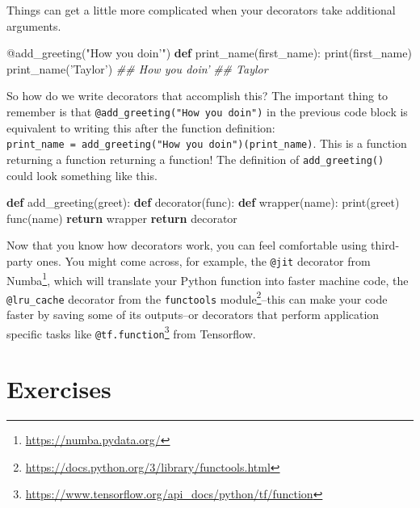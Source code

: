 \documentclass[12pt,krantz2]{krantz}
\makeatletter
\newenvironment{Shaded}{\begin{snugshade}}{\end{snugshade}}
\newcommand{\AttributeTok}[1]{\textcolor[rgb]{0.61,0.61,0.61}{#1}}
\newcommand{\BuiltInTok}[1]{#1}
\newcommand{\CommentTok}[1]{\textcolor[rgb]{0.37,0.37,0.37}{\textit{#1}}}
\newcommand{\ControlFlowTok}[1]{\textcolor[rgb]{0.27,0.27,0.27}{\textbf{#1}}}
\newcommand{\KeywordTok}[1]{\textcolor[rgb]{0.27,0.27,0.27}{\textbf{#1}}}
\newcommand{\NormalTok}[1]{#1}
\newcommand{\StringTok}[1]{\textcolor[rgb]{0.5,0.5,0.5}{#1}}
\renewcommand{\href}[2]{#2\footnote{\url{#1}}}
\newenvironment{kframe}{%
\medskip{}
\setlength{\fboxsep}{.8em}
 \def\at@end@of@kframe{}%
 \ifinner\ifhmode%
  \def\at@end@of@kframe{\end{minipage}}%
  \begin{minipage}{\columnwidth}%
 \fi\fi%
 \def\FrameCommand##1{\hskip\@totalleftmargin \hskip-\fboxsep
 \colorbox{shadecolor}{##1}\hskip-\fboxsep
     \hskip-\linewidth \hskip-\@totalleftmargin \hskip\columnwidth}%
 \MakeFramed {\advance\hsize-\width
   \@totalleftmargin\z@ \linewidth\hsize
   \@setminipage}}%
 {\par\unskip\endMakeFramed%
 \at@end@of@kframe}
\renewenvironment{Shaded}{\begin{kframe}}{\end{kframe}}
\makeatother
\begin{document}
Things can get a little more complicated when your decorators take additional arguments.

\begin{Shaded}
\begin{Highlighting}[]
\AttributeTok{@add_greeting}\NormalTok{(}\StringTok{"How you doin'"}\NormalTok{)}
\KeywordTok{def}\NormalTok{ print_name(first_name):}
    \BuiltInTok{print}\NormalTok{(first_name)}
\NormalTok{print_name(}\StringTok{'Taylor'}\NormalTok{)}
\CommentTok{## How you doin'}
\CommentTok{## Taylor}
\end{Highlighting}
\end{Shaded}

So how do we write decorators that accomplish this? The important thing to remember is that \texttt{@add\_greeting("How\ you\ doin\textquotesingle{}")} in the previous code block is equivalent to writing this after the function definition: \texttt{print\_name\ =\ add\_greeting("How\ you\ doin\textquotesingle{}")(print\_name)}. This is a function returning a function returning a function! The definition of \texttt{add\_greeting()} could look something like this.

\begin{Shaded}
\begin{Highlighting}[]
\KeywordTok{def}\NormalTok{ add_greeting(greet):}
    \KeywordTok{def}\NormalTok{ decorator(func):}
        \KeywordTok{def}\NormalTok{ wrapper(name):}
            \BuiltInTok{print}\NormalTok{(greet)}
\NormalTok{            func(name)}
        \ControlFlowTok{return}\NormalTok{ wrapper}
    \ControlFlowTok{return}\NormalTok{ decorator}
\end{Highlighting}
\end{Shaded}

Now that you know how decorators work, you can feel comfortable using third-party ones. You might come across, for example, the \texttt{@jit} decorator from \href{https://numba.pydata.org/}{Numba}, which will translate your Python function into faster machine code, the \texttt{@lru\_cache} decorator from the \href{https://docs.python.org/3/library/functools.html}{\texttt{functools} module}--this can make your code faster by saving some of its outputs--or decorators that perform application specific tasks like \href{https://www.tensorflow.org/api_docs/python/tf/function}{\texttt{@tf.function}} from Tensorflow.

\hypertarget{exercises-13}{%
\section{Exercises}\label{exercises-13}}
\end{document}
